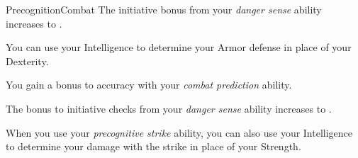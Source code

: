 \begin{feat}{Precognition}{Combat}
         The initiative bonus from your \textit{danger sense} ability increases to .

         You can use your Intelligence to determine your Armor defense in place of your Dexterity.

         You gain a  bonus to accuracy with your \textit{combat prediction} ability.

         The bonus to initiative checks from your \textit{danger sense} ability increases to .

         When you use your \textit{precognitive strike} ability, you can also use your Intelligence to determine your damage with the strike in place of your Strength.
    \end{feat}

